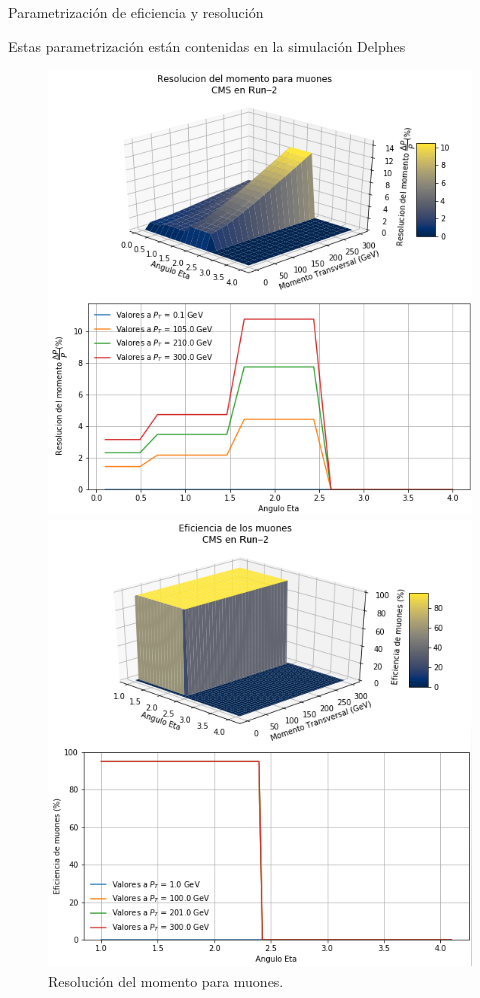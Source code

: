 \begin{frame}{Parametrizaci\'on de eficiencia y resoluci\'on}

Estas parametrizaci\'on est\'an contenidas en la simulaci\'on Delphes
\begin{figure}[ht]
\begin{minipage}[b]{0.45\linewidth}
\centering
\includegraphics[width=\textwidth]{Imag/Momentum_resolution_of_Muon_CMS.png}
\caption{Resoluci\'on del momento para muones.}
\end{minipage}
\hspace{0.5cm}
\begin{minipage}[b]{0.45\linewidth}
\centering
\includegraphics[width=\textwidth]{Imag/Eficiencia_of_Muon_CMS.png}

\end{minipage}
\end{figure}
\end{frame}
